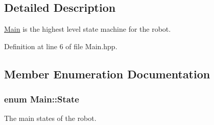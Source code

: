 \subsection{Detailed Description}
\hyperlink{classMain}{Main} is the highest level state machine for the robot. 

Definition at line 6 of file Main.\-hpp.



\subsection{Member Enumeration Documentation}
\hypertarget{classMain_a551231243a758b95cf29d8ed2b7508da}{
\subsubsection[{State}]{\setlength{\rightskip}{0pt plus 5cm}enum {\bf Main\-::\-State}\hspace{0.3cm}{\ttfamily [private]}}}\label{classMain_a551231243a758b95cf29d8ed2b7508da}


The main states of the robot. 

